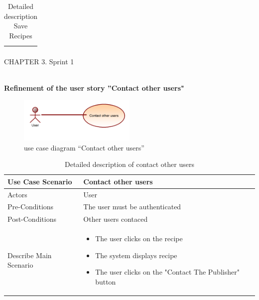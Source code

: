 \documentclass{article}
\begin{document}
{{{{{{\begin{table}[h]
\begin{tabularx}{\textwidth}{X|X}
\begin{itemize}[label=$\bullet$]
           
        \end{itemize} \\
        \bottomrule
    \end{tabularx}
    \caption{Detailed description Save Recipes}
    \label{tab:actors_roles}
\end{table}






















\newpage
\noindent
CHAPTER 3.  Sprint 1 \\
\underline{\hspace{\textwidth}} \vspace{0.2cm}\\
{\large \textbf{Refinement of the user story ”Contact other users"}
\begin{figure}[htbp]
    \centering
    \includegraphics[width=0.5\textwidth]{conta}
    \caption{use case diagram “Contact other users”}
    \label{fig:design2}
\end{figure}
\begin{table}[h]
    \centering
    \begin{tabularx}{\textwidth}{X|X}
        \toprule
        Use Case Scenario & Contact other users \\
        \midrule
        Actors & User \\
        \midrule
        Pre-Conditions & The user must be authenticated \\
        \midrule
	 Post-Conditions & Other users contaced  \\
        \midrule
        Describe Main Scenario &  \begin{itemize}[label=$\bullet$]
            \item The user clicks on the recipe
            \item The system displays recipe
            \item The user clicks on the "Contact The Publisher" button
        \end{itemize} \\
        \bottomrule
    \end{tabularx}
    \caption{Detailed description of contact other users}
    \label{tab:actors_roles}
\end{table}















}}}}}}}
\end{document}
